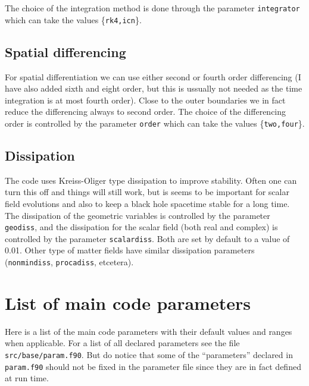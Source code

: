 \documentclass[12pt]{article}
\begin{document}
The choice of the integration method is done through the parameter
\texttt{integrator} which can take the values \{\texttt{rk4,icn}\}. \\


\subsection{Spatial differencing}

For spatial differentiation we can use either second or fourth order
differencing (I have also added sixth and eight order, but this is
ussually not needed as the time integration is at most fourth order).
Close to the outer boundaries we in fact reduce the differencing
always to second order.  The choice of the differencing order is
controlled by the parameter \texttt{order} which can take the values
\{\texttt{two,four}\}. \\


\subsection{Dissipation}

The code uses Kreiss-Oliger type dissipation to improve stability.
Often one can turn this off and things will still work, but is seems
to be important for scalar field evolutions and also to keep a black
hole spacetime stable for a long time. The dissipation of the
geometric variables is controlled by the parameter \texttt{geodiss},
and the dissipation for the scalar field (both real and complex) is
controlled by the parameter \texttt{scalardiss}. Both are set by
default to a value of 0.01. Other type of matter fields have similar
dissipation parameters (\texttt{nonmindiss}, \texttt{procadiss},
etcetera).\\



\section{List of main code parameters}
\label{sec:parameters}

Here is a list of the main code parameters with their default values
and ranges when applicable.  For a list of all declared parameters see
the file \texttt{src/base/param.f90}.  But do notice that some of the
``parameters'' declared in \texttt{param.f90} should not be fixed in
the parameter file since they are in fact defined at run time. \\
\end{document}

